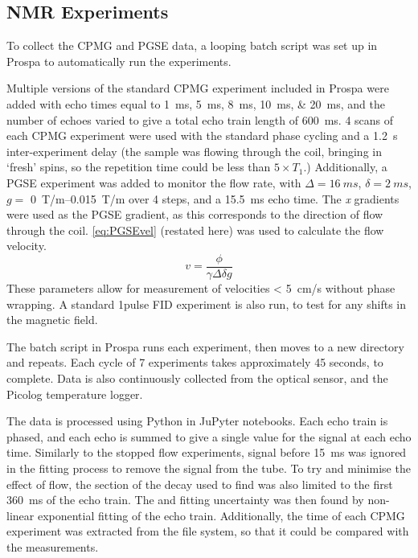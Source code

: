\subsection{NMR Experiments}
To collect the CPMG and PGSE data, a looping batch script was set up in Prospa to automatically run the experiments.

Multiple versions of the standard CPMG experiment included in Prospa were added with echo times equal to \SIlist{1;5;8;10;20}{ms}, and the number of echoes varied to give a total echo train length of \SI{600}{ms}.
4 scans of each CPMG experiment were used with the standard phase cycling and a \SI{1.2}{s} inter-experiment delay (the sample was flowing through the coil, bringing in `fresh' spins, so the repetition time could be less than $5 \times \mathit{T_1}$.)
Additionally, a PGSE experiment was added to monitor the flow rate, with $\Delta = \SI{16}{ms}$, $\delta = \SI{2}{ms}$, $\mathit{g} =$ \SIrange{0}{0.015}{T/m} over 4 steps, and a \SI{15.5}{ms} echo time.
The \textit{x} gradients were used as the PGSE gradient, as this corresponds to the direction of flow through the coil.
\autoref{eq:PGSEvel} (restated here) was used to calculate the flow velocity.
\begin{displaymath}
v = \frac{\phi}{\gamma \Delta \delta g}
\end{displaymath}
These parameters allow for measurement of velocities \SI{< 5}{cm/s} without phase wrapping.
A standard 1pulse FID experiment is also run, to test for any shifts in the magnetic field.

The batch script in Prospa runs each experiment, then moves to a new directory and repeats.
Each cycle of 7 experiments takes approximately 45 seconds, to complete.
Data is also continuously collected from the optical \SOtwo sensor, and the Picolog temperature logger.

The data is processed using Python in JuPyter notebooks.
Each echo train is phased, and each echo is summed to give a single value for the signal at each echo time.
Similarly to the stopped flow experiments, signal before \SI{15}{ms} was ignored in the fitting process to remove the signal from the tube.
To try and minimise the effect of flow, the section of the decay used to find \Ttwo was also limited to the first \SI{360}{ms} of the echo train.
The \Ttwo and fitting uncertainty was then found by non-linear exponential fitting of the echo train.
Additionally, the time of each CPMG experiment was extracted from the file system, so that it could be compared with the \SOtwo measurements.


